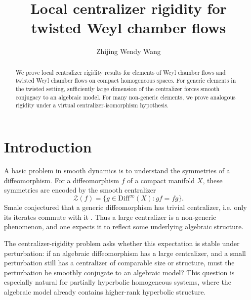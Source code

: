 \documentclass[11pt]{amsart}
\numberwithin{equation}{section}
\theoremstyle{plain}
\begin{document}
\title{Local centralizer rigidity for twisted Weyl chamber flows}
\author{Zhijing Wendy Wang}
\address{Department of Mathematics, University of Chicago, Chicago, IL 60637, USA}


\begin{abstract}
 We prove local centralizer rigidity results for elements of Weyl chamber
flows and twisted Weyl chamber flows on compact homogeneous spaces.  For
generic elements in the twisted setting, sufficiently large dimension of the centralizer
forces smooth conjugacy to an algebraic model.  For many non-generic
elements, we prove analogous rigidity under a virtual centralizer-isomorphism
hypothesis.
\end{abstract}

\maketitle

\tableofcontents

\section{Introduction}


A basic problem in smooth dynamics is to understand the symmetries of a
diffeomorphism.  For a diffeomorphism \(f\) of a compact manifold \(X\),
these symmetries are encoded by the smooth centralizer
\[
\mathcal Z(f)=\{g\in\mathrm{Diff}^\infty(X): gf=fg\}.
\]
Smale conjectured that a generic diffeomorphism has trivial centralizer,
i.e. only its iterates commute with it \cite{smale}.  Thus a large
centralizer is a non-generic phenomenon, and one expects it to reflect some
underlying algebraic structure.

The centralizer-rigidity problem asks whether this expectation is stable
under perturbation: if an algebraic diffeomorphism has a large centralizer,
and a small perturbation still has a centralizer of comparable size or
structure, must the perturbation be smoothly conjugate to an algebraic
model?  This question is especially natural for partially hyperbolic
homogeneous systems, where the algebraic model already contains higher-rank
hyperbolic structure.
\end{document}
